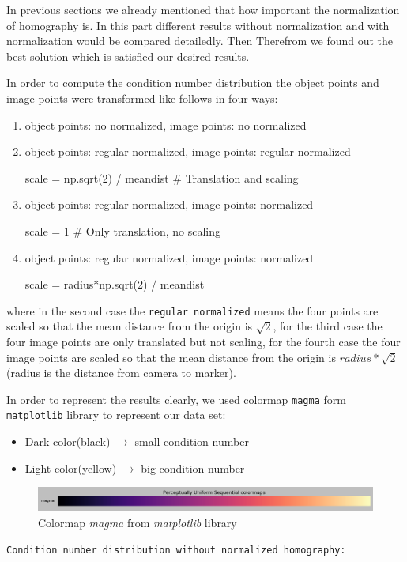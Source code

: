 In previous sections we already mentioned that how important the normalization of homography is. In this part different results without normalization and with normalization would be compared detailedly. Then Therefrom we found out the best solution which is satisfied our desired results.

In order to compute the condition number distribution the object points and image points were transformed like follows in four ways: 
\begin{enumerate}
\item object points: no normalized, image points: no normalized
\item object points: regular normalized, image points: regular normalized
\begin{python} 
scale = np.sqrt(2) / meandist # Translation and scaling 
\end{python}
\item object points: regular normalized, image points: normalized
\begin{python} 
scale = 1 # Only translation, no scaling 
\end{python}
\item object points: regular normalized, image points: normalized
\begin{python}
scale = radius*np.sqrt(2) / meandist 
\end{python}

\end{enumerate}

where in the second case the \texttt{regular normalized} means the four points are scaled so that the mean distance from the origin is $ \sqrt{2}$, for the third case the four image points are only translated but not scaling, for the fourth case the four image points are scaled so that the mean distance from the origin is $ radius * \sqrt{2}$(radius is the distance from camera to marker).

In order to represent the results clearly, we used colormap \texttt{magma} form \texttt{matplotlib} library\cite{matplotlib} to represent our data set:
\begin{itemize}
\item Dark color(black) $\to$ small condition number
\item Light color(yellow) $\to$ big condition number
\end{itemize}

\begin{figure}[H]
\centering
\includegraphics[scale=0.34]{./fig/magma.png}
\caption{Colormap \textit{magma} from \textit{matplotlib} library}  
\label{fig:magma}
\end{figure}
\texttt{Condition number distribution without normalized homography:}

